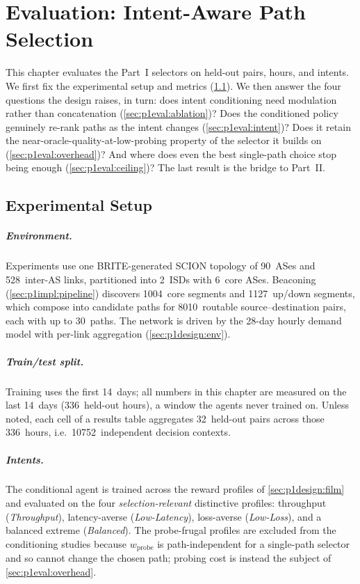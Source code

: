 \chapter{Evaluation: Intent-Aware Path Selection}
\label{ch:p1eval}

This chapter evaluates the Part~I selectors on held-out pairs, hours, and intents. We first fix the
experimental setup and metrics (\cref{sec:p1eval:setup}). We then answer the four questions the design
raises, in turn: does intent conditioning need modulation rather than concatenation
(\cref{sec:p1eval:ablation})? Does the conditioned policy genuinely re-rank paths as the intent changes
(\cref{sec:p1eval:intent})? Does it retain the near-oracle-quality-at-low-probing property of the
selector it builds on (\cref{sec:p1eval:overhead})? And where does even the best single-path choice stop
being enough (\cref{sec:p1eval:ceiling})? The last result is the bridge to Part~II.

\section{Experimental Setup}
\label{sec:p1eval:setup}

\paragraph{Environment.} Experiments use one BRITE-generated SCION topology of 90~ASes and 528~inter-AS
links, partitioned into 2~ISDs with 6~core ASes. Beaconing (\cref{sec:p1impl:pipeline}) discovers
1004~core segments and 1127~up/down segments, which compose into candidate paths for 8010~routable
source--destination pairs, each with up to 30~paths. The network is driven by the 28-day hourly demand
model with per-link aggregation (\cref{sec:p1design:env}).

\paragraph{Train/test split.} Training uses the first 14~days; all numbers in this chapter are measured
on the last 14~days (336~held-out hours), a window the agents never trained on. Unless noted, each cell
of a results table aggregates 32~held-out pairs across those 336~hours, i.e.\ 10752~independent decision
contexts.

\paragraph{Intents.} The conditional agent is trained across the reward profiles of
\cref{sec:p1design:film} and evaluated on the four \emph{selection-relevant} distinctive profiles:
throughput (\emph{Throughput}), latency-averse (\emph{Low-Latency}), loss-averse (\emph{Low-Loss}), and
a balanced extreme (\emph{Balanced}). The probe-frugal profiles are excluded from the conditioning
studies because $w_{\text{probe}}$ is path-independent for a single-path selector and so cannot change
the chosen path; probing cost is instead the subject of \cref{sec:p1eval:overhead}.

